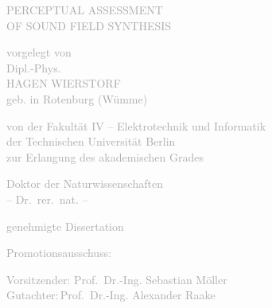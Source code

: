 \graphicspath{%
{\PATH/\TITLE/fig00/}%
}

\begin{titlepage}
    \sffamily%
    \begin{fullwidth}%
        \fontsize{36}{40}\selectfont\par\noindent\textcolor{darkgray}{\centering%
        \uppercase{Perceptual Assessment \\ of Sound Field Synthesis\\}
        }%
        \vspace{1.6cm}%
        \fontsize{18}{20}\selectfont\par\noindent\textcolor{darkgray}{\centering%
        vorgelegt von\\
        Dipl.-Phys.\\
        \MakeTextUppercase{Hagen Wierstorf}\\
        geb. in Rotenburg (W\"umme)\\
        }%
        \vspace{1.7cm}%
        \fontsize{18}{20}\selectfont\par\noindent\textcolor{darkgray}{\centering%
        von der Fakult\"at IV -- Elektrotechnik und Informatik\\
        der Technischen Universit\"at Berlin\\
        zur Erlangung des akademischen Grades\\
        }%
        \vspace{0.4cm}
        \fontsize{18}{20}\selectfont\par\noindent\textcolor{darkgray}{\centering%
        Doktor der Naturwissenschaften\\
        -- Dr.~rer.~nat. --\\
        }%
        \vspace{0.4cm}
        \fontsize{18}{20}\selectfont\par\noindent\textcolor{darkgray}{\centering%
        genehmigte Dissertation\\
        }%
        \vspace{1.7cm}%
        \fontsize{18}{20}\selectfont\par\noindent\textcolor{darkgray}{%
        Promotionsausschuss:
        }%
        \vspace{0.5cm}
        \fontsize{18}{20}\selectfont\par\noindent\textcolor{darkgray}{%
        Vorsitzender: Prof.~Dr.-Ing. Sebastian M\"oller\\
        Gutachter:\;\;\;\;\:\,Prof.~Dr.-Ing. Alexander Raake\\
}
\end{fullwidth}
\end{titlepage}
